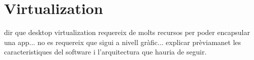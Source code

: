 \chapter{Virtualization}\label{D:virtualization}


dir que desktop virtualization requereix de molts recursos per poder encapsular una app... no es requereix que sigui a nivell gràfic... explicar prèviamanet les caracteristiques del software i l'arquitectura que hauria de seguir.
